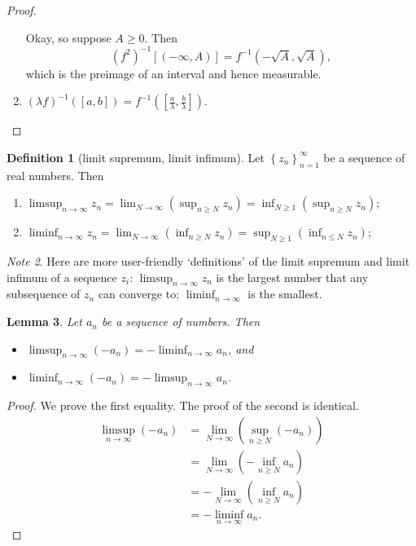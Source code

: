 \documentclass[a4paper,12pt]{scrreprt}
\theoremstyle{definition}
\newtheorem{definition}{Definition}
\theoremstyle{plain}
\newtheorem{lemma}[definition]{Lemma}
\theoremstyle{remark}
\newtheorem{note}[definition]{Note}
\begin{document}
\begin{proof}
\begin{enumerate}
      Okay, so suppose $A \geq 0$. Then
      \begin{equation*}
        {(f^{2})}^{-1}[(-\infty, A)] = f^{-1}(-\sqrt{A}, \sqrt{A}),
      \end{equation*}
      which is the preimage of an interval and hence measurable.

    \item ${(\lambda f)}^{-1}([a, b]) = f^{-1}\left( \left[ \frac{a}{\lambda}, \frac{b}{\lambda} \right] \right)$.
  \end{enumerate}
\end{proof}

\begin{definition}[limit supremum, limit infimum]
  \label{def:limsupliminf}
  Let ${\left\{ z_{n} \right\}}_{n=1}^{\infty}$ be a sequence of real numbers. Then
  \begin{enumerate}
    \item $\displaystyle\limsup_{n \to \infty} z_{n} = \lim_{N \to \infty}\left( \sup_{n \geq N} z_{n} \right) = \inf_{N \geq 1}\left( \sup_{n \geq N} z_{n} \right)$;

    \item $\displaystyle\liminf_{n \to \infty} z_{n} = \lim_{N \to \infty}\left( \inf_{n \geq N} z_{n} \right) = \sup_{N \geq 1} \left(  \inf_{n \leq N} z_{n} \right)$;
  \end{enumerate}
\end{definition}
\begin{note}
  Here are more user-friendly `definitions' of the limit supremum and limit infimum of a sequence $z_{i}$: $\limsup_{n \to \infty} z_{n}$ is the largest number that any subsequence of $z_{n}$ can converge to; $\liminf_{n \to \infty}$ is the smallest.
\end{note}

\begin{lemma}
  \label{lemma:limsupofnegativeisnegativeliminf}
  Let $a_{n}$ be a sequence of numbers. Then
  \begin{itemize}
    \item $\limsup_{n \to \infty} (- a_{n}) = - \liminf_{n \to \infty} a_{n}$, and
    \item $\liminf_{n \to \infty} (- a_{n}) = - \limsup_{n \to \infty} a_{n}$.
  \end{itemize}
\end{lemma}
\begin{proof}
  We prove the first equality. The proof of the second is identical.
  \begin{align*}
    \limsup_{n \to \infty} (-a_{n}) &= \lim_{N \to \infty}\left( \sup_{n \geq N} (-a_{n}) \right) \\
    &= \lim_{N \to \infty} \left( -\inf_{n \geq N} a_{n} \right) \\
    &= -\lim_{N \to \infty} \left( \inf_{n \geq N} a_{n} \right) \\
    &= -\liminf_{n \to \infty} a_{n}.
  \end{align*}
\end{proof}
\end{document}

